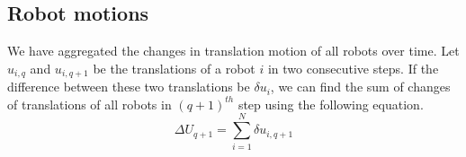 \documentclass[final,5p,times,twocolumn]{elsarticle}
\begin{document}
\subsection*{Robot motions}
We have aggregated the changes in translation motion of all robots over time. Let $u_{i,q}$ and $u_{i,q+1}$ be the translations of a robot $i$ in two consecutive steps. If the difference between these two translations be $\delta u_{i}$, we can find the sum of changes of translations of all robots in $(q+1)^{th}$ step using the following equation.
\begin{equation}
\Delta U_{q+1} = \sum_{i=1}^{N} \delta u_{i, q+1} 
\label{eqn:Delta-Tr}
\end{equation}
\begin{figure}
\centering
{}
\newline
{}
\newline
\subfloat[Series C]

\end{figure}
\end{document}
